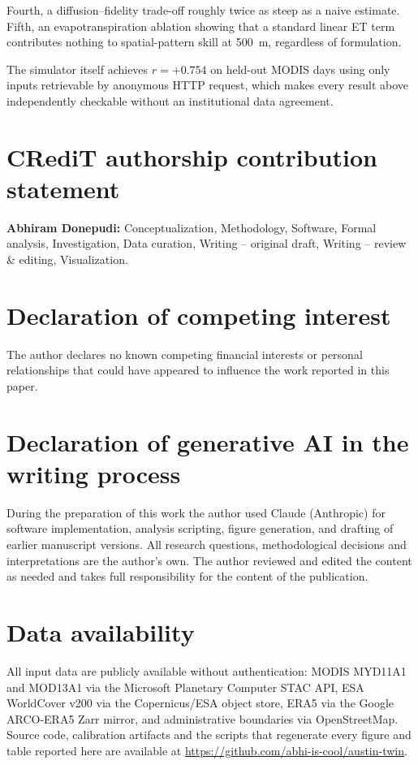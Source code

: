 \documentclass[preprint,12pt,authoryear]{elsarticle}
\begin{document}
Fourth, a diffusion--fidelity trade-off roughly twice as steep as a naive
estimate. Fifth, an evapotranspiration ablation showing that a standard
linear ET term contributes nothing to spatial-pattern skill at 500~m,
regardless of formulation.

The simulator itself achieves $r = +0.754$ on held-out MODIS days using
only inputs retrievable by anonymous HTTP request, which makes every
result above independently checkable without an institutional data
agreement.

\section*{CRediT authorship contribution statement}

\textbf{Abhiram Donepudi:} Conceptualization, Methodology, Software,
Formal analysis, Investigation, Data curation, Writing -- original draft,
Writing -- review \& editing, Visualization.

\section*{Declaration of competing interest}

The author declares no known competing financial interests or personal
relationships that could have appeared to influence the work reported in
this paper.

\section*{Declaration of generative AI in the writing process}

During the preparation of this work the author used Claude (Anthropic)
for software implementation, analysis scripting, figure generation, and
drafting of earlier manuscript versions. All research questions,
methodological decisions and interpretations are the author's own. The
author reviewed and edited the content as needed and takes full
responsibility for the content of the publication.

\section*{Data availability}

All input data are publicly available without authentication: MODIS
MYD11A1 and MOD13A1 via the Microsoft Planetary Computer STAC API, ESA
WorldCover v200 via the Copernicus/ESA object store, ERA5 via the Google
ARCO-ERA5 Zarr mirror, and administrative boundaries via OpenStreetMap.
Source code, calibration artifacts and the scripts that regenerate every
figure and table reported here are available at
\url{https://github.com/abhi-is-cool/austin-twin}.
\end{document}
